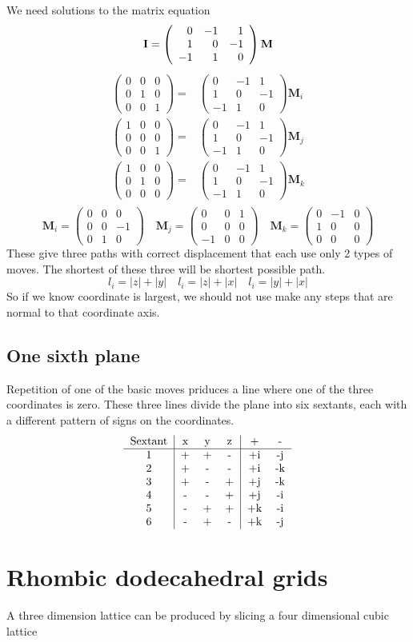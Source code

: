 \documentclass{article}
\newcommand{\matrixthreethree}[9]{\left(\begin{array}{rrr}#1&#2&#3\\#4&#5&#6\\#7&#8&#9\end{array}\right)}
\begin{document}
We need solutions to the matrix equation
\[
\mathbf{I} = 
\matrixthreethree {0}{-1}{1} {1}{0}{-1} {-1}{1}{0} \mathbf{M} \\
\]
\begin{align*}
\matrixthreethree {0}{0}{0} {0}{1}{0} {0}{0}{1} 
=& \matrixthreethree {0}{-1}{1} {1}{0}{-1} {-1}{1}{0}  \mathbf{M}_i \\
\matrixthreethree {1}{0}{0} {0}{0}{0} {0}{0}{1} 
=& \matrixthreethree {0}{-1}{1} {1}{0}{-1} {-1}{1}{0}   \mathbf{M}_j \\
\matrixthreethree {1}{0}{0} {0}{1}{0} {0}{0}{0}
=& \matrixthreethree {0}{-1}{1} {1}{0}{-1} {-1}{1}{0}  \mathbf{M}_k \\
\end{align*}
\[
\mathbf{M}_i = \matrixthreethree {0}{0}{0} {0}{0}{-1} {0}{1}{0} \quad 
\mathbf{M}_j = \matrixthreethree {0}{0}{1} {0}{0}{0} {-1}{0}{0} \quad 
\mathbf{M}_k = \matrixthreethree {0}{-1}{0} {1}{0}{0} {0}{0}{0}
\]
These give three paths with correct displacement that each use only 2 types of moves. The shortest of these three will be shortest possible path.
\[
l_i = |z| + |y| \quad l_i = |z| + |x| \quad l_i = |y| + |x|
\]
So if we know coordinate is largest, we should not use make any steps that are normal to that coordinate axis. 

\subsection{One sixth plane}
Repetition of one of the basic moves priduces a line where one of the three coordinates is zero. These three lines divide the plane into six sextants, each with a different pattern of signs on the coordinates.
\[
\begin{tabular}{c|ccc|cc}
Sextant & x & y & z & + & - \\
\hline
1&+&+&-&+i&-j\\
2&+&-&-&+i&-k\\
3&+&-&+&+j&-k\\
4&-&-&+&+j&-i\\
5&-&+&+&+k&-i\\
6&-&+&-&+k&-j\\
\end{tabular}
\]

\section{Rhombic dodecahedral grids}
A three dimension lattice can be produced by slicing a four dimensional cubic lattice
\end{document}
